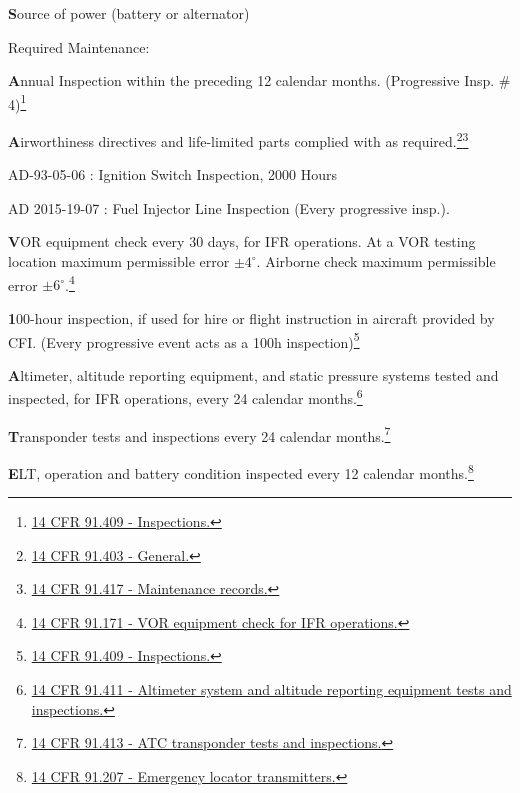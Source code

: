 \documentclass[12pt]{article}
\begin{document}
\begin{itemize}
\begin{todolist}
		\item \textbf{S}ource of power (battery or alternator)
  	\end{todolist}
  \item Required Maintenance:
  	\begin{todolist}
  		\item \textbf{A}nnual Inspection within the preceding 12 calendar months. (Progressive Insp. \# 4)\footnote{\href{https://www.law.cornell.edu/cfr/text/14/91.409}{14 CFR 91.409 - Inspections.}}
		\item \textbf{A}irworthiness directives and life-limited parts complied with as required.\footnote{\href{https://www.law.cornell.edu/cfr/text/14/91.403}{14 CFR 91.403 - General.}}\footnote{\href{https://www.law.cornell.edu/cfr/text/14/91.417}{14 CFR 91.417 - Maintenance records.}}
			\begin{todolist}
				\item AD-93-05-06 : Ignition Switch Inspection, 2000 Hours
				\item AD 2015-19-07 : Fuel Injector Line Inspection (Every progressive insp.).
			\end{todolist}
		\item \textbf{V}OR equipment check every 30 days, for IFR operations. At a VOR testing location maximum permissible error $\pm 4^\circ$. Airborne check maximum permissible error $\pm 6^\circ$.\footnote{\href{https://www.law.cornell.edu/cfr/text/14/91.171}{14 CFR 91.171 - VOR equipment check for IFR operations.}}
		\item \textbf{1}00-hour inspection, if used for hire or flight instruction in aircraft provided by CFI. (Every progressive event acts as a 100h inspection)\footnote{\href{https://www.law.cornell.edu/cfr/text/14/91.409}{14 CFR 91.409 - Inspections.}}
		\item \textbf{A}ltimeter, altitude reporting equipment, and static pressure systems tested and inspected, for IFR operations, every 24 calendar months.\footnote{\href{https://www.law.cornell.edu/cfr/text/14/91.411}{14 CFR 91.411 - Altimeter system and altitude reporting equipment tests and inspections.}}
		\item \textbf{T}ransponder tests and inspections every 24 calendar months.\footnote{\href{https://www.law.cornell.edu/cfr/text/14/91.413}{14 CFR 91.413 - ATC transponder tests and inspections.}}
		\item \textbf{E}LT, operation and battery condition inspected every 12 calendar months.\footnote{\href{https://www.law.cornell.edu/cfr/text/14/91.207}{14 CFR 91.207 - Emergency locator transmitters.}}

\end{todolist}
\end{itemize}
\end{document}
